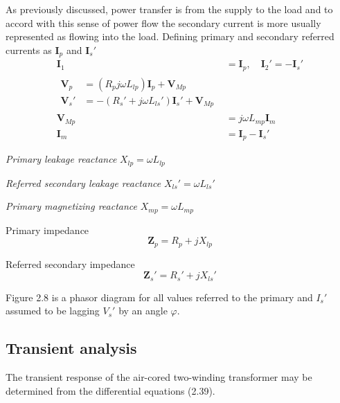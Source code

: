 \documentclass[a4paper,numbers=noenddot,12pt]{scrbook}
\begin{document}
                As previously discussed, power transfer is from the supply to the load and to accord with this sense of power flow the secondary current is more usually represented as flowing into the load. Defining primary and secondary referred currents as $\mathbf{I}_p$ and $\mathbf{I}_s'$
                \begin{align}
                    \mathbf{I}_1 & = \mathbf{I}_p, \quad \mathbf{I}_2' = - \mathbf{I}_s' \nonumber \\
                    \begin{split} 
                        \mathbf{V}_p & = (R_p j \omega L_{lp}) \mathbf{I}_p + \mathbf{V}_{Mp} \\
                        \mathbf{V}_s' & = -(R_s' + j \omega L_{ls}')\mathbf{I}_s' + \mathbf{V}_{Mp} 
                    \end{split} \\
                    \mathbf{V}_{Mp} & =j \omega L_{mp} \mathbf{I}_m \\
                    \mathbf{I}_m &= \mathbf{I}_p - \mathbf{I}_s'
                    \label{eq:Eq2.54}
                \end{align}

                \textit{Primary leakage reactance} $X_{lp} = \omega L_{lp}$ 

                \textit{Referred secondary leakage reactance} $X_{ls}' = \omega L_{ls}'$ 

                \textit{Primary magnetizing reactance} $X_{mp} = \omega L_{mp}$

                Primary impedance
                \begin{equation*}
                    \mathbf{Z}_p = R_p + jX_{lp}
                \end{equation*}

                Referred secondary impedance
                \begin{equation*}
                    \mathbf{Z}_s' = R_s' + j X_{ls}'
                \end{equation*}

                Figure 2.8 is a phasor diagram for all values referred to the primary and $I_s'$ assumed to be lagging $V_s'$ by an angle $\varphi$.

                \subsection{Transient analysis} The transient response of the air-cored two-winding transformer may be determined from the differential equations (2.39). 
\end{document}
